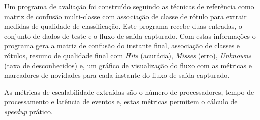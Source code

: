 




Um programa de avaliação foi construído seguindo as técnicas de referência como
matriz de confusão multi-classe com associação de classe de rótulo
\cite{Faria2016minas} para extrair medidas de qualidade de classificação.
Este programa recebe duas entradas, o conjunto de dados de teste e o fluxo de
saída capturado.
Com estas informações o programa gera a matriz de confusão do instante final, associação de
classes e rótulos, resumo de qualidade final com
\emph{Hits} (acurácia), \emph{Misses} (erro), \emph{Unknowns} (taxa de
desconhecidos) e, um gráfico de visualização do fluxo com as métricas e
marcadores de novidades para cada instante do fluxo de saída capturado.

As métricas de escalabilidade extraídas são o número de processadores, tempo de
processamento e latência de eventos e, estas métricas permitem o cálculo de
\emph{speedup} prático.

